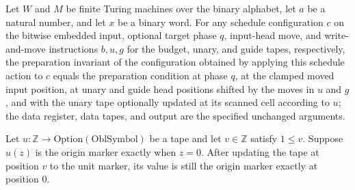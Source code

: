 \begin{lemma}
\label{Complexity.prepInvariant_action}
\leanok
{}
Let $W$ and $M$ be finite Turing machines over the binary alphabet, let $a$ be a natural
number, and let $x$ be a binary word. For any schedule configuration $c$ on the bitwise
embedded input, optional target phase $q$, input-head move, and write-and-move
instructions $b,u,g$ for the budget, unary, and guide tapes, respectively, the
preparation invariant of the configuration obtained by applying this schedule action to
$c$ equals the preparation condition at phase $q$, at the clamped moved input position,
at unary and guide head positions shifted by the moves in $u$ and $g$, and with the
unary tape optionally updated at its scanned cell according to $u$; the data register,
data tapes, and output are the specified unchanged arguments.
\end{lemma}

\begin{lemma}
\label{Complexity.unaryOrigin_update}
\leanok
{}
Let $u:\mathbb Z\to\mathrm{Option}(\mathrm{OblSymbol})$ be a tape and let $v\in\mathbb
Z$ satisfy $1\le v$. Suppose $u(z)$ is the origin marker exactly when $z=0$. After
updating the tape at position $v$ to the unit marker, its value is still the origin
marker exactly at position $0$.
\end{lemma}

